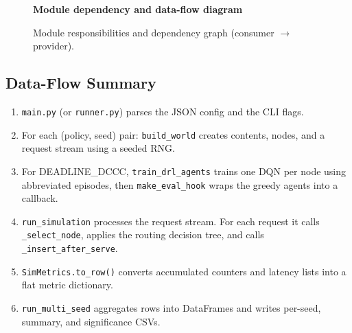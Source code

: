 \documentclass[12pt]{article}
\begin{document}
\begin{figure}[h]
\centering
\textbf{Module dependency and data-flow diagram}

\medskip
{}
\caption{Module responsibilities and dependency graph (consumer $\to$ provider).}
\label{fig:arch}
\end{figure}

\subsection{Data-Flow Summary}

\begin{enumerate}[noitemsep]
  \item \texttt{main.py} (or \texttt{runner.py}) parses the JSON config and the CLI flags.
  \item For each (policy, seed) pair: \texttt{build\_world} creates contents, nodes, and a request stream using a seeded RNG.
  \item For DEADLINE\_DCCC, \texttt{train\_drl\_agents} trains one DQN per node using abbreviated episodes, then \texttt{make\_eval\_hook} wraps the greedy agents into a callback.
  \item \texttt{run\_simulation} processes the request stream. For each request it calls \texttt{\_select\_node}, applies the routing decision tree, and calls \texttt{\_insert\_after\_serve}.
  \item \texttt{SimMetrics.to\_row()} converts accumulated counters and latency lists into a flat metric dictionary.
  \item \texttt{run\_multi\_seed} aggregates rows into DataFrames and writes per-seed, summary, and significance CSVs.
\end{enumerate}
\end{document}
